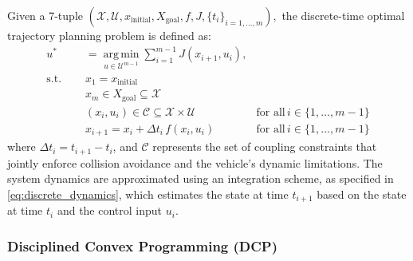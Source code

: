 Given a 7-tuple
$
	(\mathcal{X}, \mathcal{U}, x_{\text{initial}}, X_{\text{goal}}, f, J, \{t_i\}_{i=1,\dots ,m}),
$
the discrete-time optimal trajectory planning problem is defined as:
\begin{align}
	u^*     & = \underset{u \in \mathcal{U}^{m-1}}{\operatorname{arg\,min}} \sum_{i=1}^{m-1}
	J(x_{i+1}, u_{i}), \label{eq:obj}                                                                                                                                   \\ \text{s.t.
	} \quad & x_1  = x_{\text{initial}} \label{eq:init}                                                                                                                 \\
	        & x_m          \in X_{\text{goal}} \subseteq \mathcal{X} \label{eq:goal}                                                                                    \\
	        & (x_i, u_i)   \in \mathcal{C} \subseteq \mathcal{X} \times \mathcal{U}          & \text{for all}\, i \in \{1, \dots, m-1\} \label{eq:coupling_constraints} \\
	        & x_{i+1}      = x_i + \Delta t_i \, f(x_i, u_i)                                 & \text{for all}\, i \in \{1, \dots, m-1\} \label{eq:discrete_dynamics}
\end{align}
where $\Delta t_i = t_{i+1} - t_i$, and $\mathcal{C}$ represents the set of coupling constraints that jointly enforce collision avoidance and the vehicle's dynamic limitations.
The system dynamics are approximated using an integration scheme, as specified in \eqref{eq:discrete_dynamics}, which estimates the state at time
$t_{i+1}$ based on the state at time $t_i$ and the control input $u_i$.

\subsubsection{Disciplined Convex Programming (DCP)}


